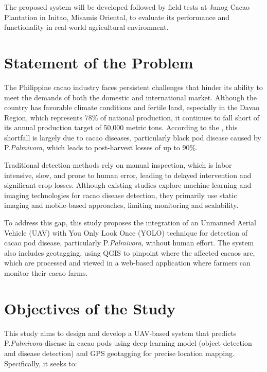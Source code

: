{The proposed system will be developed followed by field tests at Janog Cacao Plantation in Initao, Misamis Oriental, to evaluate its performance and functionality in real-world agricultural environment.


\section{Statement of the Problem}

The Philippine cacao industry faces persistent challenges that hinder its ability to meet the demands of both the domestic and international market. Although the country has favorable climate conditions and fertile land, especially in the Davao Region, which represents 78\% of national production, it continues to fall short of its annual production target of 50,000 metric tons. According to the \cite{PhilCacaoRoadmap2021}, this shortfall is largely due to cacao diseases, particularly black pod disease caused by P.\textit{Palmivora}, which leads to post-harvest losses of up to 90\%.

Traditional detection methods rely on manual inspection, which is labor intensive, slow, and prone to human error, leading to delayed intervention and significant crop losses. Although existing studies explore machine learning and imaging technologies for cacao disease detection, they primarily use static imaging and mobile-based approaches, limiting monitoring and scalability.

To address this gap, this study proposes the integration of an Unmanned Aerial Vehicle (UAV) with You Only Look Once (YOLO) technique for detection of cacao pod disease, particularly P.\textit{Palmivora}, without human effort. The system also includes geotagging, using QGIS to pinpoint where the affected cacaos are, which are processed and viewed in a web-based application where farmers can monitor their cacao farms.

\section{Objectives of the Study}

This study aims to design and develop a UAV-based system that predicts P.\textit{Palmivora} disease in cacao pods using deep learning model (object detection and disease detection) and GPS geotagging for precise location mapping. Specifically, it seeks to:

}
